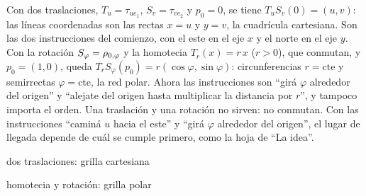 Con dos traslaciones, \(T_u=\tau_{u e_1}\), \(S_v=\tau_{v e_2}\) y \(p_0=0\), se tiene
\(T_uS_v(0)=(u,v)\): las líneas coordenadas son las rectas \(x=u\) y \(y=v\), la cuadrícula
cartesiana. Son las dos instrucciones del comienzo, con el este en el eje \(x\) y el norte en
el eje \(y\). Con la rotación \(S_\varphi=\rho_{0,\varphi}\) y la homotecia \(T_r(x)=r\,x\)
(\(r>0\)), que conmutan, y \(p_0=(1,0)\), queda \(T_rS_\varphi(p_0)=r(\cos\varphi,\sin\varphi)\):
circunferencias \(r=\text{cte}\) y semirrectas \(\varphi=\text{cte}\), la red polar. Ahora las
instrucciones son \enquote{girá \(\varphi\) alrededor del origen} y \enquote{alejate del origen
hasta multiplicar la distancia por \(r\)}, y tampoco importa el orden. Una
traslación y una rotación no sirven: no conmutan. Con las instrucciones \enquote{caminá \(u\)
hacia el este} y \enquote{girá \(\varphi\) alrededor del origen}, el lugar de llegada depende
de cuál se cumple primero, como la hoja de \enquote{La idea}.

\begin{center}
\begin{minipage}{.48\linewidth}\centering
{}

{\small dos traslaciones: grilla cartesiana}
\end{minipage}\hfill
\begin{minipage}{.48\linewidth}\centering
{}

{\small homotecia y rotación: grilla polar}
\end{minipage}
\end{center}

